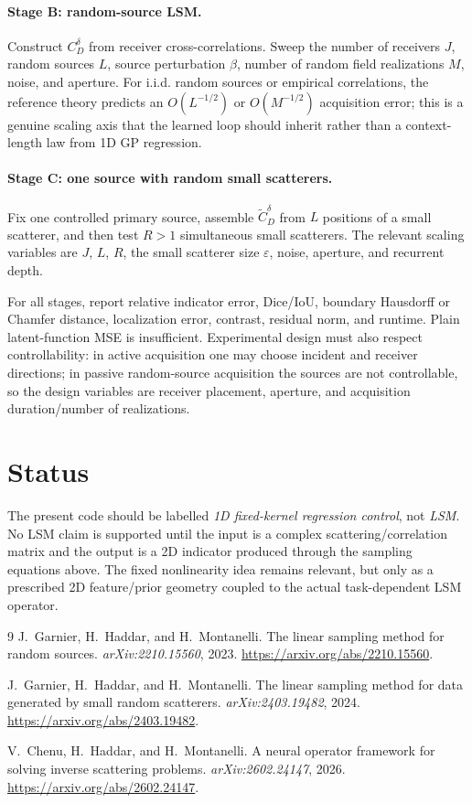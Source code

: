 \documentclass[10pt]{article}
\begin{document}
\paragraph{Stage B: random-source LSM.}
Construct $C_D^\delta$ from receiver cross-correlations.  Sweep the number of
receivers $J$, random sources $L$, source perturbation $\beta$, number of random
field realizations $M$, noise, and aperture.  For i.i.d. random sources or
empirical correlations, the reference theory predicts an
$O(L^{-1/2})$ or $O(M^{-1/2})$ acquisition error; this is a genuine scaling axis
that the learned loop should inherit rather than a context-length law from 1D
GP regression.

\paragraph{Stage C: one source with random small scatterers.}
Fix one controlled primary source, assemble $\widetilde C_D^\delta$ from
$L$ positions of a small scatterer, and then test $R>1$ simultaneous small
scatterers.  The relevant scaling variables are $J$, $L$, $R$, the small
scatterer size $\varepsilon$, noise, aperture, and recurrent depth.

For all stages, report relative indicator error, Dice/IoU, boundary Hausdorff
or Chamfer distance, localization error, contrast, residual norm, and runtime.
Plain latent-function MSE is insufficient.  Experimental design must also
respect controllability: in active acquisition one may choose incident and
receiver directions; in passive random-source acquisition the sources are not
controllable, so the design variables are receiver placement, aperture, and
acquisition duration/number of realizations.

\section{Status}

The present code should be labelled \emph{1D fixed-kernel regression control},
not \emph{LSM}.  No LSM claim is supported until the input is a complex
scattering/correlation matrix and the output is a 2D indicator produced through
the sampling equations above.  The fixed nonlinearity idea remains relevant,
but only as a prescribed 2D feature/prior geometry coupled to the actual
task-dependent LSM operator.

\begin{thebibliography}{9}
J.~Garnier, H.~Haddar, and H.~Montanelli.
\newblock The linear sampling method for random sources.
\newblock \emph{arXiv:2210.15560}, 2023.
\newblock \url{https://arxiv.org/abs/2210.15560}.

J.~Garnier, H.~Haddar, and H.~Montanelli.
\newblock The linear sampling method for data generated by small random scatterers.
\newblock \emph{arXiv:2403.19482}, 2024.
\newblock \url{https://arxiv.org/abs/2403.19482}.

V.~Chenu, H.~Haddar, and H.~Montanelli.
\newblock A neural operator framework for solving inverse scattering problems.
\newblock \emph{arXiv:2602.24147}, 2026.
\newblock \url{https://arxiv.org/abs/2602.24147}.
\end{thebibliography}
\end{document}
